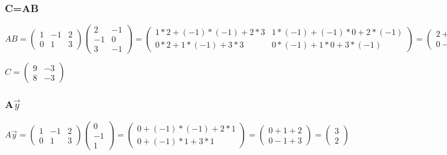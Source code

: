 \documentclass{article}
\begin{document}
\subsubsection*{C=AB}
$AB=
\left (
    \begin{matrix}
        1 & -1 & 2\\
        0 & 1 & 3
    \end{matrix}
\right )
\left (
    \begin{matrix}
        2 & -1\\
        -1 & 0\\
        3 & -1
    \end{matrix}
\right )
=
\left (
    \begin{matrix}
        1*2 + (-1)*(-1) + 2*3 & 1*(-1) + (-1)*0 + 2*(-1)\\
        0*2 + 1*(-1) + 3*3 & 0*(-1) + 1*0 + 3*(-1)
    \end{matrix}
\right )
=
\left (
    \begin{matrix}
        2 + 1 + 6 & -1 + 0 - 2\\
        0 - 1 + 9 & 0 + 0 - 3
    \end{matrix}
\right )
=
\left (
    \begin{matrix}
        9 & -3\\
        8 & -3
    \end{matrix}
\right )
$

$C=
\left (
    \begin{matrix}
        9 & -3\\
        8 & -3
    \end{matrix}
\right )
$

\subsubsection*{A$\vec{y}$}
$A\vec{y} =
\left (
    \begin{matrix}
        1 & -1 & 2\\
        0 & 1 & 3
    \end{matrix}
\right )
\left (
    \begin{matrix}
        0\\
        -1\\
        1
    \end{matrix}
\right )
=
\left (
    \begin{matrix}
        0 + (-1)*(-1) + 2*1\\
        0 + (-1)*1 + 3*1
    \end{matrix}
\right )
=
\left (
    \begin{matrix}
        0 + 1 + 2\\
        0 - 1 + 3
    \end{matrix}
\right )
=
\left (
    \begin{matrix}
        3\\
        2
    \end{matrix}
\right )
$
\end{document}
